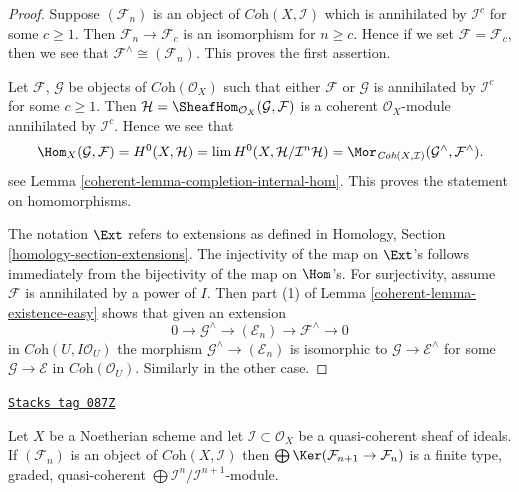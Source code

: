 \begin{proof}

Suppose $(\mathcal{F}_n)$ is an object of $\textit{Coh}(X, \mathcal{I})$
which is annihilated by $\mathcal{I}^c$ for some $c \geq 1$. Then
$\mathcal{F}_n \to \mathcal{F}_c$ is an isomorphism for $n \geq c$.
Hence if we set $\mathcal{F} = \mathcal{F}_c$, then we see that
$\mathcal{F}^\wedge \cong (\mathcal{F}_n)$. This proves the first assertion.

\medskip\noindent
Let $\mathcal{F}$, $\mathcal{G}$ be objects of $\textit{Coh}(\mathcal{O}_X)$
such that either $\mathcal{F}$ or $\mathcal{G}$ is annihilated by
$\mathcal{I}^c$ for some $c \geq 1$. Then
$\mathcal{H} = \SheafHom_{\mathcal{O}_X}(\mathcal{G}, \mathcal{F})$
is a coherent $\mathcal{O}_X$-module annihilated by $\mathcal{I}^c$.
Hence we see that
$$
\Hom_X(\mathcal{G}, \mathcal{F}) =
H^0(X, \mathcal{H}) =
\lim H^0(X, \mathcal{H}/\mathcal{I}^n\mathcal{H}) =
\Mor_{\textit{Coh}(X, \mathcal{I})}
(\mathcal{G}^\wedge, \mathcal{F}^\wedge).
$$
see Lemma \ref{coherent-lemma-completion-internal-hom}.
This proves the statement on homomorphisms.

\medskip\noindent
The notation $\Ext$ refers to extensions as defined in
Homology, Section \ref{homology-section-extensions}.
The injectivity of the map on $\Ext$'s follows immediately
from the bijectivity of the map on $\Hom$'s.
For surjectivity, assume $\mathcal{F}$ is annihilated
by a power of $I$. Then part (1) of Lemma \ref{coherent-lemma-existence-easy}
shows that given an extension
$$
0 \to \mathcal{G}^\wedge \to (\mathcal{E}_n) \to \mathcal{F}^\wedge \to 0
$$
in $\textit{Coh}(U, I\mathcal{O}_U)$
the morphism $\mathcal{G}^\wedge \to (\mathcal{E}_n)$ is
isomorphic to $\mathcal{G} \to \mathcal{E}^\wedge$
for some $\mathcal{G} \to \mathcal{E}$ in $\textit{Coh}(\mathcal{O}_U)$.
Similarly in the other case.
\end{proof}

\begin{lemma}
\label{coherent-lemma-finite-over-rees-algebra}
\href{https://stacks.math.columbia.edu/tag/087Z}{\texttt{Stacks tag 087Z}}

Let $X$ be a Noetherian scheme and let $\mathcal{I} \subset \mathcal{O}_X$
be a quasi-coherent sheaf of ideals. If $(\mathcal{F}_n)$ is an object of
$\textit{Coh}(X, \mathcal{I})$ then
$\bigoplus \Ker(\mathcal{F}_{n + 1} \to \mathcal{F}_n)$ is
a finite type, graded, quasi-coherent
$\bigoplus \mathcal{I}^n/\mathcal{I}^{n + 1}$-module.
\end{lemma}

